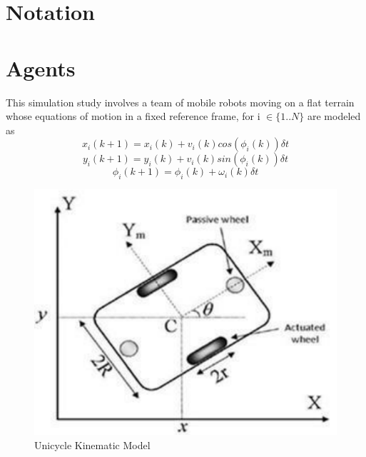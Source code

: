 \documentclass[conference]{IEEEtran}
\begin{document}
\section{Notation}

%
%
%
%
%
%
%

\section{Agents}

This simulation study involves a team of mobile robots moving on a flat terrain whose equations of motion in a fixed reference frame, for i $\in \{1..N\}$ are modeled as
$$ x_{i}(k+1) = x_{i}(k) + v_{i}(k)cos(\phi_{i}(k))\delta t $$
$$ y_{i}(k+1) = y_{i}(k) + v_{i}(k)sin(\phi_{i}(k))\delta t $$
$$ \phi_{i}(k+1) = \phi_{i}(k) + \omega_{i}(k)\delta t $$

\begin{figure}[H]
 \includegraphics[width=\linewidth]{dwg/robot.png}
  \caption{Unicycle Kinematic Model}
 
\end{figure}
\end{document}
